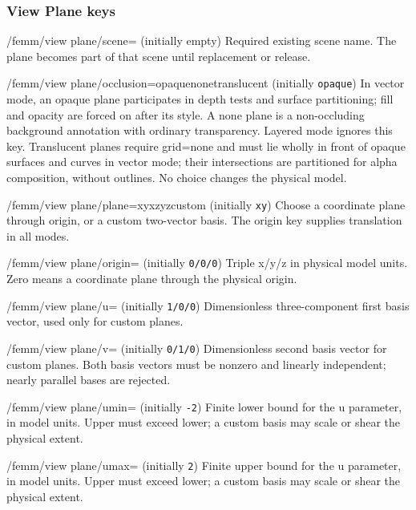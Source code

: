 \subsubsection{View Plane keys}
\begin{key}{/femm/view plane/scene= (initially empty)}
Required existing scene name. The plane becomes part of that scene until replacement or release.
\end{key}
\begin{key}{/femm/view plane/occlusion=opaque\textbar none\textbar translucent (initially \texttt{opaque})}
In vector mode, an opaque plane participates in depth tests and surface
partitioning; fill and opacity are forced on after its style. A none plane is a
non-occluding background annotation with ordinary transparency. Layered mode
ignores this key. Translucent planes require grid=none and must lie wholly
in front of opaque surfaces and curves in vector mode; their intersections
are partitioned for alpha composition, without outlines. No choice changes the physical model.
\end{key}
\begin{key}{/femm/view plane/plane=xy\textbar xz\textbar yz\textbar custom (initially \texttt{xy})}
Choose a coordinate plane through origin, or a custom two-vector basis. The origin key supplies translation in all modes.
\end{key}
\begin{key}{/femm/view plane/origin= (initially \texttt{0/0/0})}
Triple x/y/z in physical model units. Zero means a coordinate plane through the physical origin.
\end{key}
\begin{key}{/femm/view plane/u= (initially \texttt{1/0/0})}
Dimensionless three-component first basis vector, used only for custom planes.
\end{key}
\begin{key}{/femm/view plane/v= (initially \texttt{0/1/0})}
Dimensionless second basis vector for custom planes. Both basis vectors must be nonzero and linearly independent; nearly parallel bases are rejected.
\end{key}
\begin{key}{/femm/view plane/umin= (initially \texttt{-2})}
Finite lower bound for the u parameter, in model units. Upper must exceed lower; a custom basis may scale or shear the physical extent.
\end{key}
\begin{key}{/femm/view plane/umax= (initially \texttt{2})}
Finite upper bound for the u parameter, in model units. Upper must exceed lower; a custom basis may scale or shear the physical extent.
\end{key}
